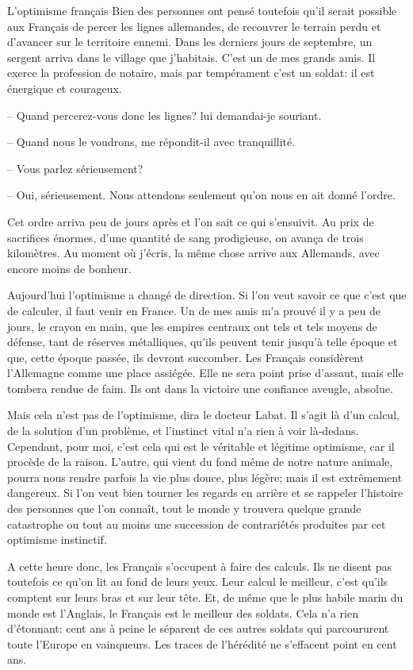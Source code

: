 \begin{chapter}{L'optimisme français}
Bien des personnes ont pensé toutefois qu'il serait possible aux
Français de percer les lignes allemandes, de recouvrer le terrain perdu
et d'avancer sur le territoire ennemi. Dans les derniers jours de
septembre, un sergent arriva dans le village que j'habitais. C'est un de
mes grands amis. Il exerce la profession de notaire, mais par
tempérament c'est un soldat: il est énergique et courageux.

--  Quand percerez-vous donc les lignes? lui demandai-je souriant.

--  Quand nous le voudrons, me répondit-il avec tranquillité.

--  Vous parlez sérieusement?

--  Oui, sérieusement. Nous attendons seulement qu'on nous en ait donné
l'ordre.

Cet ordre arriva peu de jours après et l'on sait ce qui s'ensuivit. Au
prix de sacrifices énormes, d'une quantité de sang prodigieuse, on
avança de trois kilomètres. Au moment où j'écris, la même chose arrive
aux Allemands, avec encore moins de bonheur.

Aujourd'hui l'optimisme a changé de direction. Si l'on veut savoir ce
que c'est que de calculer, il faut venir en France. Un de mes amis m'a
prouvé il y a peu de jours, le crayon en main, que les empires centraux
ont tels et tels moyens de défense, tant de réserves métalliques, qu'ils
peuvent tenir jusqu'à telle époque et que, cette époque passée, ils
devront succomber. Les Français considèrent l'Allemagne comme une place
assiégée. Elle ne sera point prise d'assaut, mais elle tombera rendue de
faim. Ils ont dans la victoire une confiance aveugle, absolue.

\horizontalLine

Mais cela n'est pas de l'optimisme, dira le docteur Labat. Il s'agit là
d'un calcul, de la solution d'un problème, et l'instinct vital n'a rien
à voir là-dedans. Cependant, pour moi, c'est cela qui est le véritable
et légitime optimisme, car il procède de la raison. L'autre, qui vient
du fond même de notre nature animale, pourra nous rendre parfois la vie
plus douce, plus légère; mais il est extrêmement dangereux. Si l'on veut
bien tourner les regards en arrière et se rappeler l'histoire des
personnes que l'on connaît, tout le monde y trouvera quelque grande
catastrophe ou tout au moins une succession de contrariétés produites
par cet optimisme instinctif.

A cette heure donc, les Français s'occupent à faire des calculs. Ils ne
disent pas toutefois ce qu'on lit au fond de leurs yeux. Leur calcul le
meilleur, c'est qu'ils comptent sur leurs bras et sur leur tête. Et, de
même que le plus habile marin du monde est l'Anglais, le Français est le
meilleur des soldats. Cela n'a rien d'étonnant: cent ans à peine le
séparent de ces autres soldats qui parcoururent toute l'Europe en
vainqueurs. Les traces de l'hérédité ne s'effacent point en cent ans.


\end{chapter}

